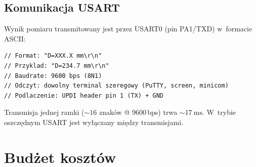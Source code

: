 \documentclass[a4paper,11pt]{article}
\begin{document}
\subsection{Komunikacja USART}
\label{sec:usart}

Wynik pomiaru transmitowany jest przez USART0 (pin PA1/TXD) w~formacie ASCII:

\begin{lstlisting}[caption={Format ramki wyjściowej USART}, label={lst:uart_frame}]
// Format: "D=XXX.X mm\r\n"
// Przyklad: "D=234.7 mm\r\n"
// Baudrate: 9600 bps (8N1)
// Odczyt: dowolny terminal szeregowy (PuTTY, screen, minicom)
// Podlaczenie: UPDI header pin 1 (TX) + GND
\end{lstlisting}

Transmisja jednej ramki (${\sim}16$ znaków @ 9600\,bps) trwa ${\sim}\SI{17}{\milli\second}$.
W~trybie oszczędnym USART jest wyłączany między transmisjami.


\section{Budżet kosztów}
\label{sec:koszty}
\end{document}
